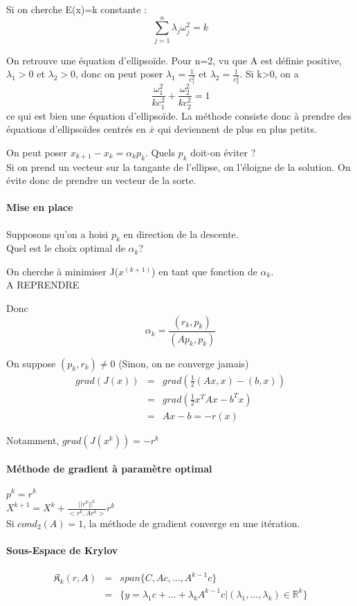 \documentclass{article}
\theoremstyle{mes_theoremes}
\begin{document}
Si on cherche E(x)=k constante : \[\sum_{j=1}^n \lambda_j \omega_j^2 = k\]

On retrouve une équation d'ellipsoïde. Pour n=2, vu que A est définie positive, $\lambda_1 > 0$ et $\lambda_2 >0$, donc on peut poser $\lambda_1 = \frac{1}{c_1^2}$ et $\lambda_2 = \frac{1}{c_2^2}$. Si k>0, on a \[\frac{\omega_1^2}{kc_1^2} + \frac{\omega_2^2}{kc_2^2}=1\] ce qui est bien une équation d'ellipsoïde. La méthode consiste donc à prendre des équations d'ellipsoïdes centrés en $\bar{x}$ qui deviennent de plus en plus petits.

On peut poser $x_{k+1} - x_k = \alpha_k p_k$. Quels $p_k$ doit-on éviter ? \\
Si on prend un vecteur sur la tangante de l'ellipse, on l'éloigne de la solution. On évite donc de prendre un vecteur de la sorte.

\paragraph{Mise en place \\}
Supposons qu'on a hoisi $p_k$ en direction de la descente.\\
Quel est le choix optimal de $\alpha_k$?

On cherche à minimiser J($x^{(k+1)}$) en tant que fonction de $\alpha_k$. \\
A REPRENDRE

Donc \[\alpha_k = \frac{(r_k,p_k)}{(Ap_k,p_k)}\]

On suppose $(p_k,r_k)\neq 0$ (Sinon, on ne converge jamais)
\begin{eqnarray*}
grad(J(x))&=& grad\left(\frac{1}{2}(Ax,x)-(b,x)\right) \\
&=& grad \left(\frac{1}{2}x^TAx-b^Tx \right) \\
&=& Ax-b = -r(x)
\end{eqnarray*}

Notamment, $grad(J(x^k))=-r^k$

\paragraph{Méthode de gradient à paramètre optimal \\}
$p^k=r^k$ \\
$X^{k+1}=X^k + \frac{||r^k||^2}{<r^k,Ar^k>}r^k$ \\

Si $cond_2(A)=1$, la méthode de gradient converge en une itération.

\paragraph{Sous-Espace de Krylov}

\begin{eqnarray*}
\mathfrak{K}_k (r,A)&=&span\{C,Ac,...,A^{k-1}c\} \\
&=& \{y=\lambda_1 c + ... + \lambda_k A^{k-1}c | (\lambda_1,...,\lambda_k)\in\mathbb{R}^k\}
\end{eqnarray*}
\end{document}
